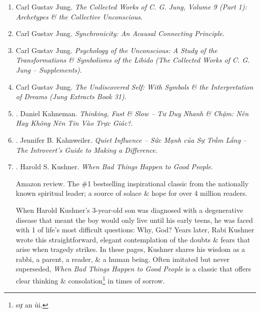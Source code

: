 \documentclass{article}
\begin{document}
\begin{enumerate}
	\item {\sc Carl Gustav Jung}. {\it The Collected Works of C. G. Jung, Volume 9 (Part 1): Archetypes \& the Collective Unconscious}.
	
	\item {\sc Carl Gustav Jung}. {\it Synchronicity: An Acausal Connecting Principle}.
	
	\item {\sc Carl Gustav Jung}. {\it Psychology of the Unconscious: A Study of the Transformations \& Symbolisms of the Libido (The Collected Works of C. G. Jung -- Supplements)}.
	
	\item {\sc Carl Gustav Jung}. {\it The Undiscovered Self: With Symbols \& the Interpretation of Dreams (Jung Extracts Book 31)}.
	
	\item \cite{Kahneman2022}. Daniel Kahneman. {\it Thinking, Fast \& Slow -- Tư Duy Nhanh \& Chậm: Nên Hay Không Nên Tin Vào Trực Giác?}.\hfill{\sf[done]}
	
	\item \cite{Kahnweiler2022}. Jennifer B. Kahnweiler. {\it Quiet Influence -- Sức Mạnh của Sự Trầm Lắng -- The Introvert's Guide to Making a Difference}.\hfill{\sf[done]}
	
	\item \cite{Kushner_bad_things_good_people}. {\sc Harold S. Kushner}. {\it When Bad Things Happen to Good People}. {}
	
	{\sf Amazon review.} The \#1 bestselling inspirational classic from the nationally known spiritual leader; a source of solace \& hope for over 4 million readers.
	
	When {\sc Harold Kushner}'s 3-year-old son was diagnosed with a degenerative disease that meant the boy would only live until his early teens, he was faced with 1 of life's most difficult questions: Why, God? Years later, {\sc Rabi Kushner} wrote this straightforward, elegant contemplation of the doubts \& fears that arise when tragedy strikes. In these pages, {\sc Kushner} shares his wisdom as a rabbi, a parent, a reader, \& a human being. Often imitated but never superseded, {\it When Bad Things Happen to Good People} is a classic that offers clear thinking \& consolation\footnote{sự an ủi.} in times of sorrow.
	

\end{enumerate}
\end{document}
